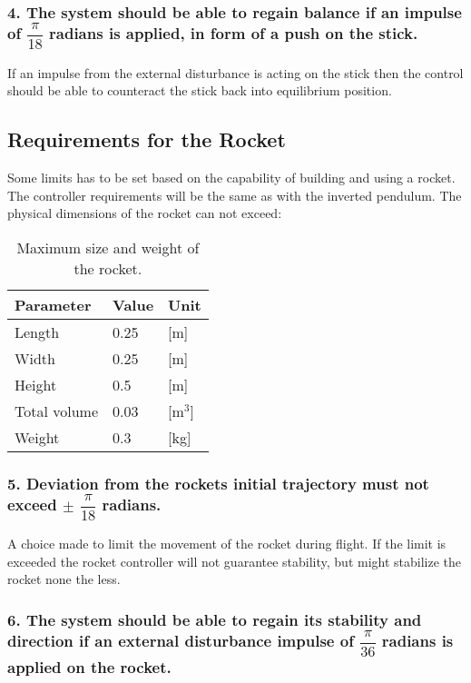 \subsubsection*{4. The system should be able to regain balance if an impulse of $\dfrac{\pi}{18}$ radians is applied, in form of a push on the stick.} 
\forceindent If an impulse from the external disturbance is acting on the stick then the control should be able to counteract the stick back into equilibrium position.   



\subsection{Requirements for the Rocket}
Some limits has to be set based on the capability of building and using a rocket. The controller requirements will be the same as with the inverted pendulum.  
The physical dimensions of the rocket can not exceed:
\begin{table}[htbp]
\centering
\begin{tabular}{lll}
\hline
Parameter    & Value & Unit  \\ \hline
Length       & 0.25  & [m]     \\
Width        & 0.25  & [m]     \\
Height       & 0.5   & [m]     \\
Total volume & 0.03  & [m$^3$] \\
Weight       & 0.3   & [kg]   
\end{tabular}
\caption{Maximum size and weight of the rocket.}
\label{RocketDimensions}
\end{table}


\subsubsection*{5. Deviation from the rockets initial trajectory must not exceed $\pm$ $\dfrac{\pi}{18}$ radians.} 

\forceindent A choice made to limit the movement of the rocket during flight. If the limit is exceeded the rocket controller will not guarantee stability, but might stabilize the rocket none the less. 

\subsubsection*{6. The system should be able to regain its stability and direction if an external disturbance impulse of $\dfrac{\pi}{36}$ radians is applied on the rocket.} 

